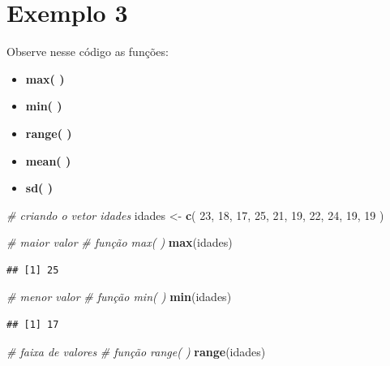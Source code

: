 \documentclass[
]{book}
\newenvironment{Shaded}{\begin{snugshade}}{\end{snugshade}}
\newcommand{\CommentTok}[1]{\textcolor[rgb]{0.56,0.35,0.01}{\textit{#1}}}
\newcommand{\DecValTok}[1]{\textcolor[rgb]{0.00,0.00,0.81}{#1}}
\newcommand{\FunctionTok}[1]{\textcolor[rgb]{0.13,0.29,0.53}{\textbf{#1}}}
\newcommand{\NormalTok}[1]{#1}
\newcommand{\OtherTok}[1]{\textcolor[rgb]{0.56,0.35,0.01}{#1}}
\begin{document}
\section{Exemplo 3}\label{exemplo-3}

Observe nesse código as funções:

\begin{itemize}
\item
  \textbf{max( )}
\item
  \textbf{min( )}
\item
  \textbf{range( )}
\item
  \textbf{mean( )}
\item
  \textbf{sd( )}
\end{itemize}

\begin{Shaded}
\begin{Highlighting}[]
\CommentTok{\# criando o vetor idades }
\NormalTok{idades }\OtherTok{\textless{}{-}} \FunctionTok{c}\NormalTok{( }\DecValTok{23}\NormalTok{, }\DecValTok{18}\NormalTok{, }\DecValTok{17}\NormalTok{, }\DecValTok{25}\NormalTok{, }\DecValTok{21}\NormalTok{, }\DecValTok{19}\NormalTok{, }\DecValTok{22}\NormalTok{, }\DecValTok{24}\NormalTok{, }\DecValTok{19}\NormalTok{, }\DecValTok{19}\NormalTok{ )}

\CommentTok{\# maior valor}
\CommentTok{\# função max( )}
\FunctionTok{max}\NormalTok{(idades)}
\end{Highlighting}
\end{Shaded}

\begin{verbatim}
## [1] 25
\end{verbatim}

\begin{Shaded}
\begin{Highlighting}[]
\CommentTok{\# menor valor}
\CommentTok{\# função min( )}
\FunctionTok{min}\NormalTok{(idades)}
\end{Highlighting}
\end{Shaded}

\begin{verbatim}
## [1] 17
\end{verbatim}

\begin{Shaded}
\begin{Highlighting}[]
\CommentTok{\# faixa de valores}
\CommentTok{\# função range( )}
\FunctionTok{range}\NormalTok{(idades)}
\end{Highlighting}
\end{Shaded}
\end{document}
